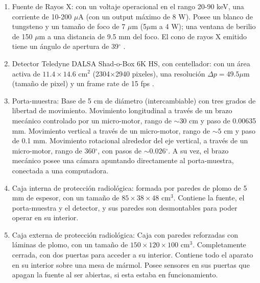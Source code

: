 \begin{enumerate}[label=\alph*)]
    \item Fuente de Rayos X: con un voltaje operacional en el rango 20-90 keV, una
    corriente de 10-200 $\mu$A (con un output máximo de 8 W). Posee un blanco de
    tungsteno y un tamaño de foco de 7 $\mu$m (5$\mu$m a 4 W); una ventana de berilio
    de 150 $\mu$m a una distancia de 9.5 mm del foco. El cono de rayos X emitido
    tiene un ángulo de apertura de 39$^{\circ}$ \cite{manual_fuente}.
    \item Detector Teledyne DALSA Shad-o-Box 6K HS, con centellador: con un área activa de $11.4\times
    14.6\text{ cm}^2$ (2304$\times$2940 pixeles), una resolución $\Delta p= 49.5\mu\text{m}$
    (tamaño de pixel) y un frame rate de 15 fps \cite{manual_detector}.
    \item Porta-muestra: Base de 5 cm de diámetro (intercambiable) con tres grados
    de libertad de movimiento. Movimiento longitudinal a través de un brazo mecánico
    controlado por un micro-motor, rango de $\sim 30$ cm y paso de 0.00635 mm. Movimiento
    vertical a través de un micro-motor, rango de $\sim 5$ cm y paso de 0.1 mm.
    Movimiento rotacional alrededor del eje vertical, a través de un micro-motor,
    rango de 360$^{\circ}$, con pasos de $\sim 0.026$$^{\circ}$. A su vez, el brazo mecánico posee una
    cámara apuntando directamente al porta-muestra, conectada a una computadora.
    \item Caja interna de protección radiológica: formada por paredes de plomo de 5 mm de espesor,
    con un tamaño de $85\times 38\times 48\text{ cm}^3$. Contiene la
    fuente, el porta-muestra y el detector, y sus paredes son desmontables para poder
    operar en su interior.
    \item Caja externa de protección radiológica: Caja con paredes reforzadas con láminas de plomo,
    con un tamaño de $150\times 120\times 100\text{ cm}^3$. Completamente cerrada, con dos
    puertas para acceder a su interior. Contiene todo el aparato en su interior sobre
    una mesa de mármol. Posee sensores en sus puertas que apagan la fuente al ser
    abiertas, si esta estaba en funcionamiento.
\end{enumerate}

